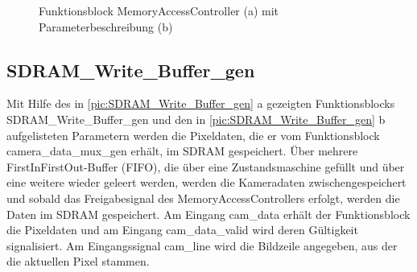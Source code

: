 \documentclass[ngerman,12pt]{article} %
\begin{document}
{\begin{figure}[h!tb]
  \centering
  \qquad
  \caption[Funktionsblock MemoryAccessController mit Parameterbeschreibung]{\label{pic:Memory_Access_Controller}Funktionsblock MemoryAccessController (a) mit Parameterbeschreibung (b)}
\end{figure}



\subsection{SDRAM\_Write\_Buffer\_gen}
\label{sec:SDRAM_Write_Buffer_gen}
Mit Hilfe des in \autoref{pic:SDRAM_Write_Buffer_gen} a gezeigten Funktionsblocks SDRAM\_Write\_Buffer\_gen und den in \autoref{pic:SDRAM_Write_Buffer_gen} b aufgelisteten Parametern werden die Pixeldaten, die er vom Funktionsblock camera\_data\_mux\_gen erhält, im SDRAM gespeichert. Über mehrere FirstInFirstOut-Buffer (FIFO), die über eine Zustandsmaschine gefüllt und über eine weitere wieder geleert werden, werden die Kameradaten zwischengespeichert und sobald das Freigabesignal des MemoryAccessControllers erfolgt, werden die Daten im SDRAM gespeichert. Am Eingang cam\_data erhält der Funktionsblock die Pixeldaten und am Eingang cam\_data\_valid wird deren Gültigkeit signalisiert. Am Eingangssignal cam\_line wird die Bildzeile angegeben, aus der die aktuellen Pixel stammen.\\

}
\end{document}
